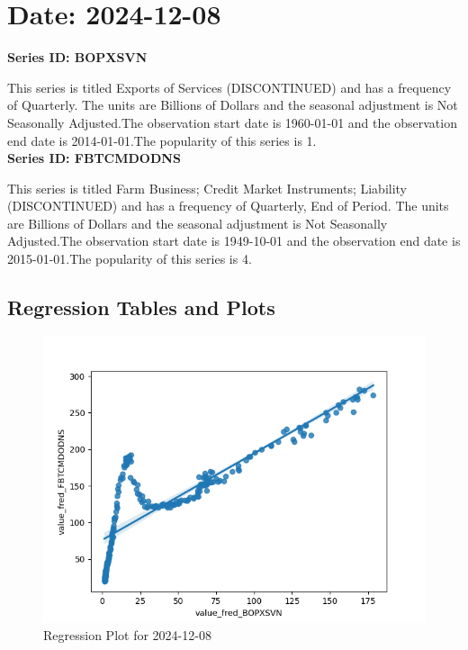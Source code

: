 \section{Date: 2024-12-08}
\noindent \textbf{Series ID: BOPXSVN} 

\noindent This series is titled Exports of Services (DISCONTINUED) and has a frequency of Quarterly. The units are Billions of Dollars and the seasonal adjustment is Not Seasonally Adjusted.The observation start date is 1960-01-01 and the observation end date is 2014-01-01.The popularity of this series is 1. \\ 

\noindent \textbf{Series ID: FBTCMDODNS} 

\noindent This series is titled Farm Business; Credit Market Instruments; Liability (DISCONTINUED) and has a frequency of Quarterly, End of Period. The units are Billions of Dollars and the seasonal adjustment is Not Seasonally Adjusted.The observation start date is 1949-10-01 and the observation end date is 2015-01-01.The popularity of this series is 4. \\ 

\subsection{Regression Tables and Plots}


\begin{figure}
\centering
\includegraphics[scale = 0.9]{plots/plot_2024-12-08.png}
\caption{Regression Plot for 2024-12-08}
\end{figure}
\newpage
